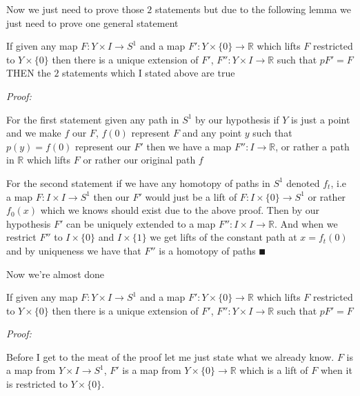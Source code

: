 \documentclass[paper=a4,fontsize=paper,12.5pt]{book}
\newcommand{\3}{\vspace*{3mm}}
\newcommand{\Proof}{\textit{Proof:}}
\newcommand{\R}{\mathbb{R}}
\newcommand{\C}[1]{{S}^{#1}}
\begin{document}
Now we just need to prove those $2$ statements but due to the following lemma we just need to prove one general statement


\begin{lemma}

If given any map $F: Y \times I \to \C{1}$ and a map $F': Y \times \{0\} \to \R$ which lifts $F$ restricted to $Y \times \{0\}$ then there is a unique extension of $F'$, $F'': Y \times I \to \R$ such that  $pF' = F$ THEN the $2$ statements which I stated above are true
 

\end{lemma}

\Proof 

For the first statement given any path in $\C{1}$ by our hypothesis if $Y$ is just a point and we make $f$ our $F$, $f(0)$ represent $F$ and any point $y$ such that $p(y) = f(0)$ represent our $F'$ then we have a map $F'':I \to \R$, or rather a path in $\R$ which lifts $F$ or rather our original path $f$

\3

For the second statement if we have any homotopy of paths in $\C{1}$ denoted ${f}_{t}$, i.e a map $F: I \times I \to \C{1}$ then our $F'$ would just be a lift of $F:I \times \{0\} \to \C{1}$ or rather ${f}_{0}(x)$ which we knows should exist due to the above proof. Then by our hypothesis $F'$ can be uniquely extended to a map $F'': I \times I \to \R$. And when we restrict $F''$ to $I \times \{0\}$ and $I \times \{1\}$ we get lifts of the constant path at ${x} = {f}_{t}(0)$ and by uniqueness we have that $F''$ is a homotopy of paths $\QED$



Now we're almost done 
\newpage

\begin{theorem}

If given any map $F: Y \times I \to \C{1}$ and a map $F': Y \times \{0\} \to \R$ which lifts $F$ restricted to $Y \times \{0\}$ then there is a unique extension of $F'$, $F'': Y \times I \to \R$ such that  $pF' = F$

\end{theorem}

\Proof

Before I get to the meat of the proof let me just state what we already know. $F$ is a map from $Y \times I \to \C{1}$, $F'$ is a map from $Y \times \{0\} \to \R$ which is a lift of $F$ when it is restricted to $Y \times \{0\}$. 

\3
\end{document}
